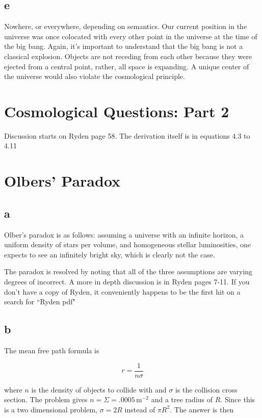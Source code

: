 \documentclass[12pt]{article}
\begin{document}
\subsection*{e}

Nowhere, or everywhere, depending on semantics. Our current position in the universe was once colocated with every other point in the universe at the time of the big bang. Again, it's important to understand that the big bang is not a classical explosion. Objects are not receding from each other because they were ejected from a central point, rather, all space is expanding. A unique center of the universe would also violate the cosmological principle.


\section{Cosmological Questions: Part 2}

Discussion starts on Ryden page 58. The derivation itself is in equations 4.3 to 4.11


\section{Olbers' Paradox}

\subsection*{a}

Olber's paradox is as follows: assuming a universe with an infinite horizon, a uniform density of stars per volume, and homogeneous stellar luminosities, one expects to see an infinitely bright sky, which is clearly not the case.

The paradox is resolved by noting that all of the three assumptions are varying degrees of incorrect. A more in depth discussion is in Ryden pages 7-11. If you don't have a copy of Ryden, it conveniently happens to be the first hit on a search for ``Ryden pdf"

\subsection*{b}


The mean free path formula is

\[r = \frac{1}{n\sigma}
\]


where \(n\) is the density of objects to collide with and \(\sigma\) is the collision cross section. The problem gives \(n = \Sigma = .0005 \,\mathrm{m}^{-2}\) and a tree radius of \(R\). Since this is a two dimensional problem, \(\sigma = 2R\) instead of \(\pi R^2\). The answer is then
\end{document}
